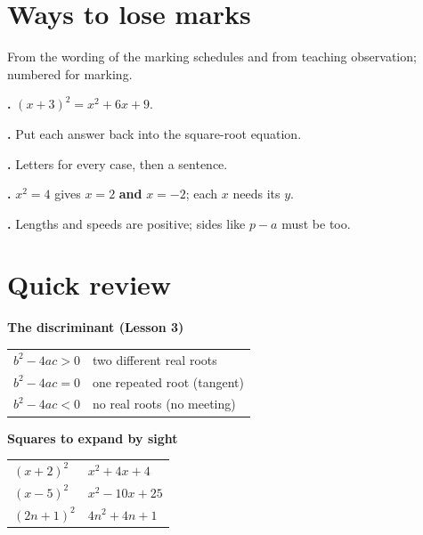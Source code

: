 \documentclass[11pt]{article}
\begin{document}
\section{Ways to lose marks}\label{h4:lose}
From the wording of the marking schedules and from teaching observation; numbered for marking.
\begin{description}[leftmargin=10mm, labelwidth=9mm, labelsep=1mm, font=\normalfont]
\item[\textbf{\Lref{squaresum}}] \textbf{.} $(x+3)^{2} = x^{2} + 6x + 9$.
\item[\textbf{\Lref{check}}] \textbf{.} Put each answer back into the square-root equation.
\item[\textbf{\Lref{general}}] \textbf{.} Letters for every case, then a sentence.
\item[\textbf{\Lref{allpoints}}] \textbf{.} $x^{2} = 4$ gives $x = 2$ \textbf{and} $x = -2$; each $x$ needs its $y$.
\item[\textbf{\Lref{contextcheck}}] \textbf{.} Lengths and speeds are positive; sides like $p - a$ must be too.
\end{description}

\section{Quick review}\label{h4:review}
\renewcommand\arraystretch{1.45}
\begin{minipage}[t]{0.47\textwidth}\vspace{0pt}
\textbf{The discriminant (Lesson 3)}\par\smallskip
\begin{tabular}{@{}l l@{}}
\toprule
$b^{2} - 4ac > 0$ & two different real roots \\
$b^{2} - 4ac = 0$ & one repeated root (tangent) \\
$b^{2} - 4ac < 0$ & no real roots (no meeting) \\
\bottomrule
\end{tabular}
\end{minipage}\hfill
\begin{minipage}[t]{0.47\textwidth}\vspace{0pt}
\textbf{Squares to expand by sight}\par\smallskip
\begin{tabular}{@{}l l@{}}
\toprule
$(x + 2)^{2}$ & $x^{2} + 4x + 4$ \\
$(x - 5)^{2}$ & $x^{2} - 10x + 25$ \\
$(2n + 1)^{2}$ & $4n^{2} + 4n + 1$ \\
\bottomrule
\end{tabular}
\end{minipage}
\end{document}
